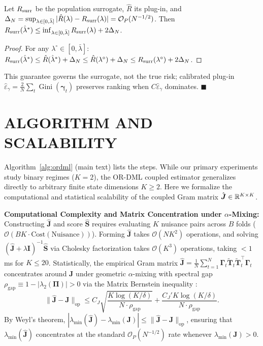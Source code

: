 \begin{lemma}
\label{lem:surrogate_oracle}
Let $R_{\rm surr}$ be the population surrogate, $\hat R$ its plug-in, and $\Delta_N=\sup_{\lambda\in[0,\bar\lambda]}|\hat R(\lambda)-R_{\rm surr}(\lambda)|=\mathcal{O}_P(N^{-1/2})$.
Then $R_{\rm surr}(\hat\lambda^*)\le\inf_{\lambda\in[0,\bar\lambda]}R_{\rm surr}(\lambda)+2\Delta_N$.
\end{lemma}
\begin{proof}
For any $\lambda^\circ\in[0,\bar\lambda]$: $R_{\rm surr}(\hat\lambda^*)\le\hat R(\hat\lambda^*)+\Delta_N\le\hat R(\lambda^\circ)+\Delta_N\le R_{\rm surr}(\lambda^\circ)+2\Delta_N$.
\end{proof}
This guarantee governs the surrogate, not the true risk; calibrated plug-in $\hat\varepsilon_\gamma = \frac{2}{N}\sum_t \operatorname{Gini}(\boldsymbol\gamma_t)$ preserves ranking when $C\hat\varepsilon_\gamma$ dominates. $\blacksquare$

\section{ALGORITHM AND SCALABILITY}
\label{app:algorithm}
Algorithm~\ref{alg:ordml} (main text) lists the steps.
While our primary experiments study binary regimes ($K=2$), the OR-DML coupled estimator generalizes directly to arbitrary finite state dimensions $K \ge 2$. Here we formalize the computational and statistical scalability of the coupled Gram matrix $\hat{\boldsymbol{J}} \in \mathbb{R}^{K \times K}$.

\textbf{Computational Complexity and Matrix Concentration under $\alpha$-Mixing:}
Constructing $\hat{\boldsymbol{J}}$ and score $\hat{\boldsymbol{S}}$ requires evaluating $K$ nuisance pairs across $B$ folds ($\mathcal{O}(B K \cdot \mathrm{Cost}(\text{Nuisance}))$). Forming $\hat{\boldsymbol{J}}$ takes $\mathcal{O}(N K^2)$ operations, and solving $(\hat{\boldsymbol{J}} + \lambda \boldsymbol{I})^{-1}\hat{\boldsymbol{S}}$ via Cholesky factorization takes $\mathcal{O}(K^3)$ operations, taking $<1$ ms for $K \le 20$.
Statistically, the empirical Gram matrix $\hat{\boldsymbol{J}} = \frac{1}{N}\sum_{t=1}^N \boldsymbol{\Gamma}_t \tilde{\boldsymbol{T}}_t \tilde{\boldsymbol{T}}_t^\top \boldsymbol{\Gamma}_t$ concentrates around $\boldsymbol{J}$ under geometric $\alpha$-mixing with spectral gap $\rho_{\mathrm{gap}} \equiv 1 - |\lambda_2(\boldsymbol{\Pi})| > 0$ via the Matrix Bernstein inequality \citep{banna2016bernstein}:
\begin{equation}
    \|\hat{\boldsymbol{J}} - \boldsymbol{J}\|_{\mathrm{op}} \le C_J \sqrt{\frac{K \log(K/\delta)}{N \cdot \rho_{\mathrm{gap}}}} + \frac{C_J' K \log(K/\delta)}{N \cdot \rho_{\mathrm{gap}}}.
\end{equation}
By Weyl's theorem, $|\lambda_{\min}(\hat{\boldsymbol{J}}) - \lambda_{\min}(\boldsymbol{J})| \le \|\hat{\boldsymbol{J}} - \boldsymbol{J}\|_{\mathrm{op}}$, ensuring that $\lambda_{\min}(\hat{\boldsymbol{J}})$ concentrates at the standard $\mathcal{O}_P(N^{-1/2})$ rate whenever $\lambda_{\min}(\boldsymbol{J}) > 0$.

